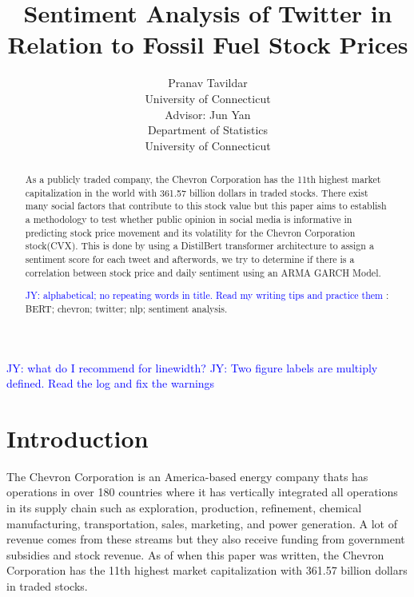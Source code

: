 \documentclass[12pt, letterpaper, titlepage]{article}
\title{Sentiment Analysis of Twitter in Relation to Fossil Fuel Stock Prices}
\author{Pranav Tavildar\\
  University of Connecticut \\
  Advisor: Jun Yan\\
  Department of Statistics\\
  University of Connecticut
}
\newcommand{\jy}[1]{\textcolor{blue}{JY: #1}}
\begin{document}
\maketitle
\doublespace

\begin{abstract}
As a publicly traded company, the Chevron Corporation has the 11th highest market capitalization in the world with 361.57 billion dollars in traded stocks. There exist many social factors that contribute to this stock value but this paper aims to establish a methodology to test whether public opinion in social media is informative in predicting stock price movement and its volatility for the Chevron Corporation stock(CVX). This is done by using a DistilBert transformer architecture to assign a sentiment score for each tweet and afterwords, we try to determine if there is a correlation between stock price and daily sentiment using an ARMA GARCH Model.


\jy{alphabetical; no repeating words in title. Read my writing tips and practice them}
\bigskip
{}:
BERT;
chevron;
twitter;
nlp;
sentiment analysis.

\end{abstract}

\jy{what do I recommend for linewidth?}
\jy{Two figure labels are multiply defined. Read the log and fix the warnings}
\section{Introduction}
\label{sec: intro}

The Chevron Corporation is an America-based energy company thats has operations in over 180 countries where it has vertically integrated all operations in its supply chain such as exploration, production, refinement, chemical manufacturing, transportation, sales, marketing, and power generation. A lot of revenue comes from these streams but they also receive funding from government subsidies and stock revenue. As of when this paper was written, the Chevron Corporation has the 11th highest market capitalization with 361.57 billion dollars in traded stocks.
\end{document}
